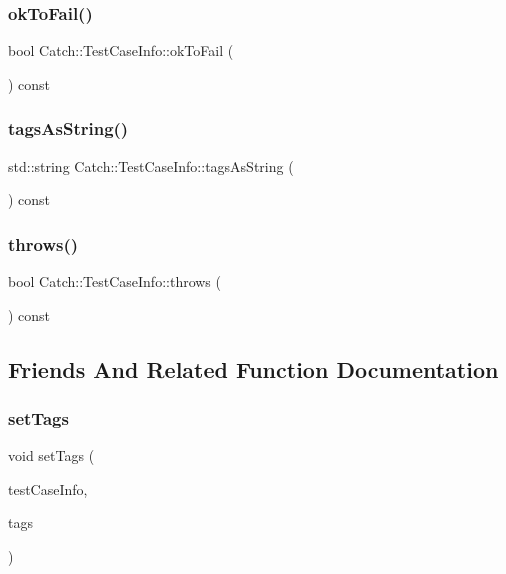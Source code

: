 \mbox{\label{struct_catch_1_1_test_case_info_a5f37291295e3a6de2dd85324c941edaf}} 
\subsubsection{okToFail()}
{\footnotesize\ttfamily bool Catch\+::\+Test\+Case\+Info\+::ok\+To\+Fail (\begin{DoxyParamCaption}{ }\end{DoxyParamCaption}) const}

\mbox{\label{struct_catch_1_1_test_case_info_a17506de67fb18e27511c17f8a81119d8}} 
\subsubsection{tagsAsString()}
{\footnotesize\ttfamily std\+::string Catch\+::\+Test\+Case\+Info\+::tags\+As\+String (\begin{DoxyParamCaption}{ }\end{DoxyParamCaption}) const}

\mbox{\label{struct_catch_1_1_test_case_info_afc70d4379a2070cc22b693ffe3932c1a}} 
\subsubsection{throws()}
{\footnotesize\ttfamily bool Catch\+::\+Test\+Case\+Info\+::throws (\begin{DoxyParamCaption}{ }\end{DoxyParamCaption}) const}



\subsection{Friends And Related Function Documentation}
\mbox{\label{struct_catch_1_1_test_case_info_a0fe44abaf18ae7c26f98a9fc2b08679c}} 
\subsubsection{setTags}
{\footnotesize\ttfamily void set\+Tags (\begin{DoxyParamCaption}\item[{\textbf{ Test\+Case\+Info} \&}]{test\+Case\+Info,  }\item[{std\+::vector$<$ std\+::string $>$}]{tags }\end{DoxyParamCaption})\hspace{0.3cm}{\ttfamily [friend]}}



